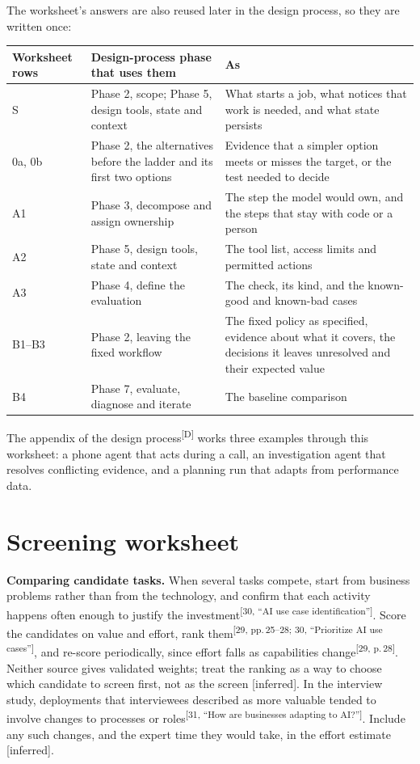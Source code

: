 \documentclass[10pt]{article}
\newcommand{\inferred}{\textsf{\small[inferred]}}
\newcommand{\p}[1]{\textsuperscript{[#1]}}
\begin{document}
The worksheet's answers are also reused later in the design process, so they are written once:
\begin{center}
\small
\begin{tabularx}{\linewidth}{@{}l L L@{}}
\toprule
Worksheet rows & Design-process phase that uses them & As \\
\midrule
S & Phase 2, scope; Phase 5, design tools, state and context & What starts a job, what notices that work is needed, and what state persists \\
0a, 0b & Phase 2, the alternatives before the ladder and its first two options & Evidence that a simpler option meets or misses the target, or the test needed to decide \\
A1 & Phase 3, decompose and assign ownership & The step the model would own, and the steps that stay with code or a person \\
A2 & Phase 5, design tools, state and context & The tool list, access limits and permitted actions \\
A3 & Phase 4, define the evaluation & The check, its kind, and the known-good and known-bad cases \\
B1--B3 & Phase 2, leaving the fixed workflow & The fixed policy as specified, evidence about what it covers, the decisions it leaves unresolved and their expected value \\
B4 & Phase 7, evaluate, diagnose and iterate & The baseline comparison \\
\bottomrule
\end{tabularx}
\end{center}

The appendix of the design process\p{D} works three examples through this worksheet: a phone agent that acts during a call, an investigation agent that resolves conflicting evidence, and a planning run that adapts from performance data.

\section{Screening worksheet}\label{sec:worksheet}

\textbf{Comparing candidate tasks.}
When several tasks compete, start from business problems rather than from the technology, and confirm that each activity happens often enough to justify the investment\p{30, ``AI use case identification''}. Score the candidates on value and effort, rank them\p{29, pp.\,25--28; 30, ``Prioritize AI use cases''}, and re-score periodically, since effort falls as capabilities change\p{29, p.\,28}. Neither source gives validated weights; treat the ranking as a way to choose which candidate to screen first, not as the screen \inferred.
In the interview study, deployments that interviewees described as more valuable tended to involve changes to processes or roles\p{31, ``How are businesses adapting to AI?''}. Include any such changes, and the expert time they would take, in the effort estimate \inferred.
\end{document}
